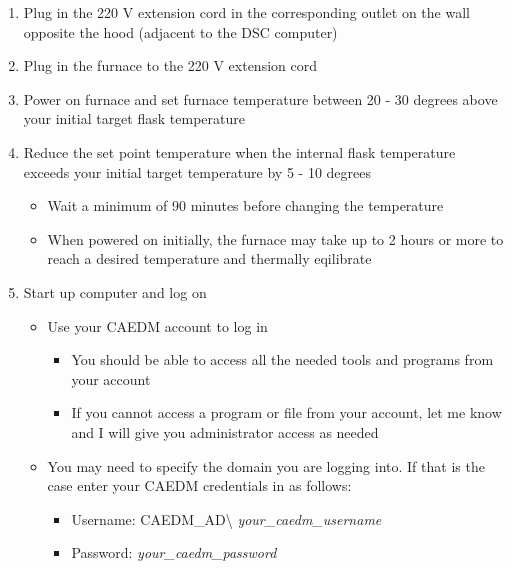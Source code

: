 \documentclass[letterpaper,11pt]{article}
\begin{document}
    \begin{enumerate}
    \item Plug in the 220 V extension cord in the corresponding outlet on 
        the wall opposite the hood (adjacent to the DSC computer)
    \item Plug in the furnace to the 220 V extension cord
    \item Power on furnace and set furnace temperature between 20 - 30 degrees 
        above your initial target flask temperature 
    \item Reduce the set point temperature when the internal flask temperature 
        exceeds your initial target temperature by 5 - 10 degrees 
        \begin{itemize}
        \item Wait a minimum of 90 minutes before changing the temperature
        \item When powered on initially, the furnace may take up to 2 hours or   
            more to reach a desired temperature and thermally eqilibrate
        \end{itemize}
    
    \item Start up computer and log on
        \begin{itemize}
        \item Use your CAEDM account to log in
            \begin{itemize}
            \item You should be able to access all the needed tools and 
                programs from your account
            \item If you cannot access a program or file from your account, let 
                me know and I will give you administrator access as needed
            \end{itemize}
        
        \item You may need to specify the domain you are logging into. If that 
            is the case enter your CAEDM credentials in as follows:
            \begin{itemize}
            \item Username: CAEDM\_AD\textbackslash
            \textit{your\_caedm\_username}
            \item Password: \textit{your\_caedm\_password}
            \end{itemize}
        
        

\end{itemize}
\end{enumerate}
\end{document}
